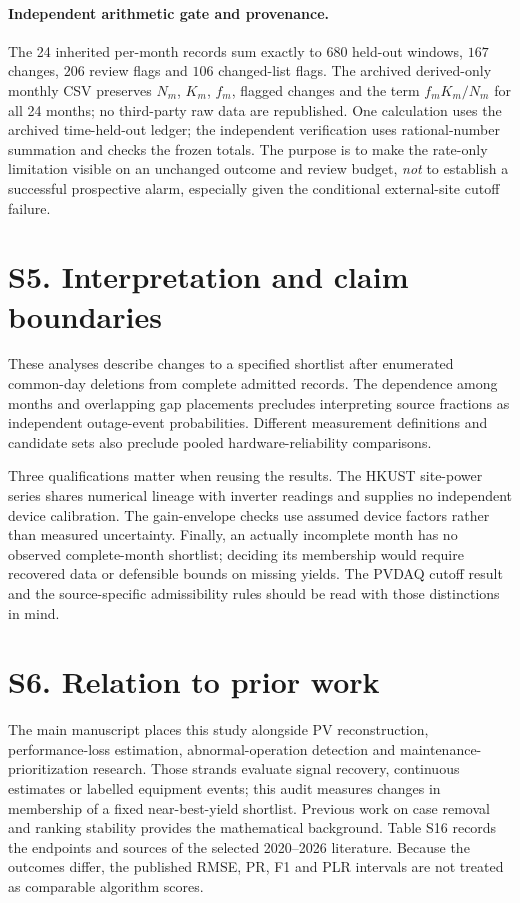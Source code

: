 \documentclass[11pt]{article}
\begin{document}
\paragraph{Independent arithmetic gate and provenance.} The 24 inherited per-month records sum exactly to $680$ held-out windows, $167$ changes, $206$ review flags and $106$ changed-list flags. The archived derived-only monthly CSV preserves $N_m$, $K_m$, $f_m$, flagged changes and the term $f_mK_m/N_m$ for all 24 months; no third-party raw data are republished. One calculation uses the archived time-held-out ledger; the independent verification uses rational-number summation and checks the frozen totals. The purpose is to make the rate-only limitation visible on an unchanged outcome and review budget, \emph{not} to establish a successful prospective alarm, especially given the conditional external-site cutoff failure.


\section*{S5. Interpretation and claim boundaries}
These analyses describe changes to a specified shortlist after enumerated common-day deletions from complete admitted records. The dependence among months and overlapping gap placements precludes interpreting source fractions as independent outage-event probabilities. Different measurement definitions and candidate sets also preclude pooled hardware-reliability comparisons.

Three qualifications matter when reusing the results. The HKUST site-power series shares numerical lineage with inverter readings and supplies no independent device calibration. The gain-envelope checks use assumed device factors rather than measured uncertainty. Finally, an actually incomplete month has no observed complete-month shortlist; deciding its membership would require recovered data or defensible bounds on missing yields. The PVDAQ cutoff result and the source-specific admissibility rules should be read with those distinctions in mind.

\section*{S6. Relation to prior work}
The main manuscript places this study alongside PV reconstruction, performance-loss estimation, abnormal-operation detection and maintenance-prioritization research. Those strands evaluate signal recovery, continuous estimates or labelled equipment events; this audit measures changes in membership of a fixed near-best-yield shortlist. Previous work on case removal and ranking stability provides the mathematical background. Table S16 records the endpoints and sources of the selected 2020--2026 literature. Because the outcomes differ, the published RMSE, PR, F1 and PLR intervals are not treated as comparable algorithm scores.
\end{document}
